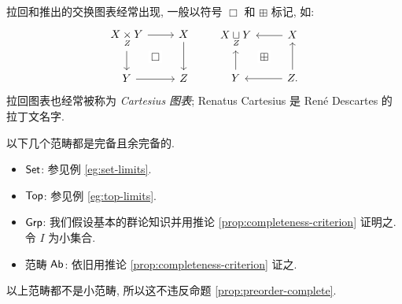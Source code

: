 \begin{convention}
	拉回和推出的交换图表经常出现, 一般以符号 $\Box$ 和 $\boxplus$ 标记, 如:
	\begin{equation}\begin{tikzcd}
		X \dtimes{Z} Y \arrow[r] \arrow[d] & X \arrow[d] \arrow[ld, phantom, "\Box" description] \\
		Y \arrow[r] & Z
	\end{tikzcd}
	\qquad
	\begin{tikzcd}
		X \dsqcup{Z} Y & X \arrow[l] \arrow[ld, phantom, "\boxplus" description] \\
		Y \arrow[u] & Z \arrow[u] \arrow[l] .
	\end{tikzcd}\end{equation}
	拉回图表也经常被称为 \emph{Cartesius 图表}; Renatus Cartesius 是 René Descartes 的拉丁文名字.
\end{convention}

\begin{example}\label{eg:complete-cocomplete}
	以下几个范畴都是完备且余完备的.
	\begin{itemize}
		\item $\mathsf{Set}$: 参见例 \ref{eg:set-limits}.
		\item $\mathsf{Top}$: 参见例 \ref{eg:top-limits}.
		\item $\mathsf{Grp}$: 我们假设基本的群论知识并用推论 \ref{prop:completeness-criterion} 证明之. 令 $I$ 为小集合.
	\item 范畴 $\mathsf{Ab}$: 依旧用推论 \ref{prop:completeness-criterion} 证之.
	\end{itemize}
	以上范畴都不是小范畴, 所以这不违反命题 \ref{prop:preorder-complete}.
\end{example}

